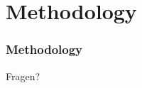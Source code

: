 \section{Methodology}

\begin{frame}
    \frametitle{Methodology}

    \begin{center}
        Fragen?
    \end{center}
\end{frame}